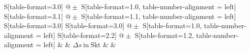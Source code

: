 \begin{table}[h!]
    \centering
    \caption{Rubidium ($n=5,z=37$) -- Abschirmungszahl für das betrachtete Dublett, sowie bei der Berechnung verwendete Größen}
    \label{tab:Rubidium}
    \begin{tabular}{
	S[table-format=3.0]
	@{${}\pm{}$}
	S[table-format=1.0, table-number-alignment = left]
	S[table-format=3.1]
	@{${}\pm{}$}
	S[table-format=1.1, table-number-alignment = left]
	S[table-format=3.0]
	S[table-format=3.0]
	@{${}\pm{}$}
	S[table-format=1.0, table-number-alignment = left]
	S[table-format=2.2]
	@{${}\pm{}$}
	S[table-format=1.2, table-number-alignment = left]
	}
	\toprule
			& 		& 
	{$\Delta s \ \mathrm{in} \ \mathrm{Skt}$}		& 		& 
			\\ 
	\midrule
    
    \bottomrule
    \end{tabular}
    \end{table}
